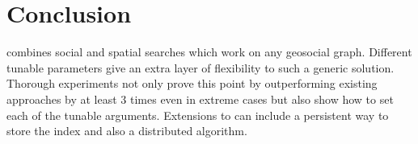 \section{Conclusion} \label{sec:conclusion}
{\grp} combines social and spatial searches which work on any geosocial graph. Different tunable parameters give an extra layer of flexibility to such a generic solution. Thorough experiments not only prove this point by outperforming existing approaches by at least 3 times even in extreme cases but also show how to set each of the tunable arguments. Extensions to {\grp} can include a persistent way to store the index and also a distributed {\grp} algorithm.
